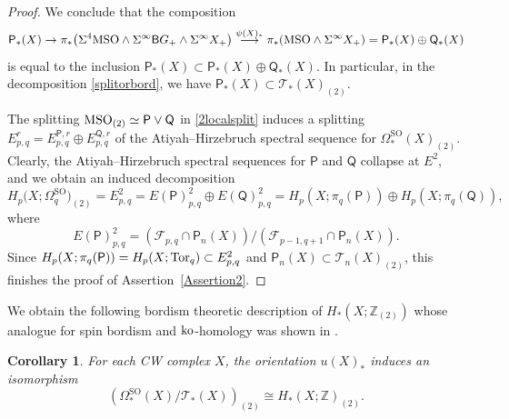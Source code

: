 \documentclass[10pt,a4paper]{amsart}
\numberwithin{equation}{section}
\newtheorem{Corollary}[Theorem]{Corollary}
\newcommand{\Z}{\mathbb{Z}}
\newcommand{\SO}{\mathrm{SO}}
\newcommand{\MSO}{{\rm MSO}}
\newcommand{\sB}{{\sf B}}
\newcommand{\Tor}{{\rm Tor}}
\begin{document}
\begin{proof}
We conclude that the composition
\[
 \mathsf{P}_*(X) \to \pi_*\big( \Sigma^4 \MSO \wedge \Sigma^{\infty} \sB G_+ \wedge \Sigma^{\infty}X_+\big) \stackrel{\psi(X)_*}{\longrightarrow} \pi_*(\MSO \wedge \Sigma^{\infty} X_+) = \mathsf{P}_*(X) \oplus \mathsf{Q}_*(X)
\]
is equal to the inclusion $ \mathsf{P}_*(X) \subset \mathsf{P}_*(X) \oplus \mathsf{Q}_*(X)$.
In particular, in the decomposition \eqref{splitorbord}, we have $\mathsf{P}_*(X) \subset \mathscr{T}_*(X)_{(2)}$.

The splitting $\MSO_{(2)} \simeq \mathsf{P} \vee \mathsf{Q}$ in \eqref{2localsplit} induces a splitting $E^r_{p,q} = E^{\mathsf{P}, r}_{p,q} \oplus E^{\mathsf{Q}, r}_{p,q}$ of the Atiyah--Hirzebruch spectral sequence for $\Omega^{\SO}_*(X)_{(2)}$.
Clearly, the Atiyah--Hirzebruch spectral sequences for $\mathsf{P}$ and $\mathsf{Q}$ collapse at $E^2$, and we obtain an induced decomposition
\[
 H_p\big(X; \Omega^{\SO}_q\big)_{(2)} = E^2_{p,q} = E(\mathsf{P})^{2}_{p,q} \oplus E(\mathsf{Q})^{2}_{p,q} = H_p(X ; \pi_q( \mathsf{P})) \oplus H_p(X ; \pi_q( \mathsf{Q})),
\]
where
\[
 E(\mathsf{P})^{2}_{p,q} = \left( \mathscr{F}_{p,q} \cap \mathsf{P}_n(X)\right) / \left( \mathscr{F}_{p-1,q+1} \cap \mathsf{P}_n(X) \right).
\]
Since $H_p(X ; \pi_q( \mathsf{P})) = H_p(X; \Tor_q) \subset E^2_{p,q}$ and $\mathsf{P}_n(X) \subset \mathscr{T}_n(X)_{(2)}$, this finishes the proof of Assertion~\ref{Assertion2}.
\end{proof}

We obtain the following bordism theoretic description of $H_*(X ; \Z_{(2)})$ whose analogue for spin bordism and ${\rm ko}$-homology was shown in \cite[Theorem B\,(2)]{Stolz_splitting}.

\begin{Corollary} For each CW complex $X$, the orientation $u(X)_*$ induces an isomorphism
\[
 \left( \Omega^{\SO}_*(X) / \mathscr{T}_*(X) \right)_{(2)} \cong H_*(X; \Z)_{(2)} .
\]
\end{Corollary}
\end{document}
